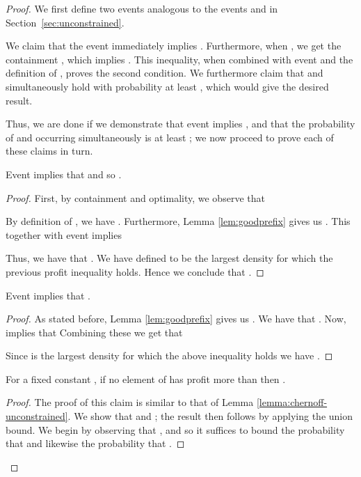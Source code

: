 \begin{proof}
We first define two events analogous to the events  and  in
Section~\ref{sec:unconstrained}.


We claim that the event  immediately implies
. Furthermore, when ,
we get the containment
, which
implies
. This
inequality, when combined with event  and the definition of
, proves the second condition. We furthermore claim that 
and  simultaneously hold with probability at least ,
which would give the desired result.

Thus, we are done if we demonstrate that event  implies
, and that the probability of  and 
occurring simultaneously is at least ; we now proceed to prove each of
these claims in turn.






\begin{claim}
\label{lem:upperbound_guess}
  Event  implies that  and so .
\end{claim}

\begin{proof}
  First, by containment and optimality, we observe that
   
  By definition of , we have . Furthermore, 
  Lemma \ref{lem:goodprefix} gives us . This together with event  implies
  
  Thus, we have that .  We have defined
   to be the largest density for which the previous profit
  inequality holds. Hence we conclude that .
\end{proof}
\begin{claim}
\label{lem:lowerbound_guess}
  Event  implies that .
\end{claim}

\begin{proof}

As stated before, Lemma \ref{lem:goodprefix} gives us
. We have
that . Now,  implies that
   Combining these we get that
  

  Since  is the largest density for which the above inequality
  holds we have .
\end{proof}



\begin{claim}
\label{lem:chernoff-matroid}
For a fixed constant , if no element of  has profit more
than  then .
\end{claim}
\begin{proof}
The proof of this claim is similar to that of Lemma
\ref{lemma:chernoff-unconstrained}. We show that  and ; the result then follows by applying the
union bound.  We begin by observing that
,
and so it suffices to bound the probability that
 and likewise the probability that .




\end{proof}
\end{proof}
